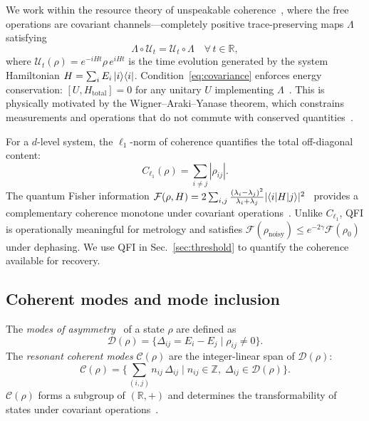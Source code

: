 \documentclass[prx,twocolumn,superscriptaddress,longbibliography,floatfix]{revtex4-2}
\begin{document}
We work within the resource theory of unspeakable coherence~\cite{Shiraishi2024,Marvian2014,Lostaglio2019}, where the free operations are covariant channels---completely positive trace-preserving maps $\Lambda$ satisfying
\begin{equation}
\Lambda \circ \mathcal{U}_t = \mathcal{U}_t \circ \Lambda \quad \forall\, t \in \mathbb{R},
\label{eq:covariance}
\end{equation}
where $\mathcal{U}_t(\rho) = e^{-iHt} \rho\, e^{iHt}$ is the time evolution generated by the system Hamiltonian $H = \sum_i E_i \ket{i}\!\bra{i}$.
Condition~\eqref{eq:covariance} enforces energy conservation: $[U, H_\mathrm{total}] = 0$ for any unitary $U$ implementing $\Lambda$~\cite{Marvian2014}.
This is physically motivated by the Wigner--Araki--Yanase theorem, which constrains measurements and operations that do not commute with conserved quantities~\cite{Wigner1952}.

For a $d$-level system, the $\ell_1$-norm of coherence quantifies the total off-diagonal content:
\begin{equation}
C_{\ell_1}(\rho) = \sum_{i \neq j} |\rho_{ij}|.
\label{eq:l1coherence}
\end{equation}
The quantum Fisher information $\mathcal{F}(\rho, H) = 2 \sum_{i,j} \frac{(\lambda_i - \lambda_j)^2}{\lambda_i + \lambda_j} |\!\braket{i|H|j}\!|^2$~\cite{Braunstein1994} provides a complementary coherence monotone under covariant operations~\cite{Shiraishi2024}.
Unlike $C_{\ell_1}$, QFI is operationally meaningful for metrology and satisfies $\mathcal{F}(\rho_\mathrm{noisy}) \leq e^{-2\gamma} \mathcal{F}(\rho_0)$ under dephasing.
We use QFI in Sec.~\ref{sec:threshold} to quantify the coherence available for recovery.


\subsection{Coherent modes and mode inclusion}
\label{sec:modes}

The \emph{modes of asymmetry}~\cite{Lostaglio2019} of a state $\rho$ are defined as
\begin{equation}
\mathcal{D}(\rho) = \bigl\{ \Delta_{ij} = E_i - E_j \mid \rho_{ij} \neq 0 \bigr\}.
\label{eq:modes}
\end{equation}
The \emph{resonant coherent modes} $\mathcal{C}(\rho)$ are the integer-linear span of $\mathcal{D}(\rho)$:
\begin{equation}
\mathcal{C}(\rho) = \biggl\{ \sum_{(i,j)} n_{ij}\, \Delta_{ij} \;\bigg|\; n_{ij} \in \mathbb{Z},\; \Delta_{ij} \in \mathcal{D}(\rho) \biggr\}.
\label{eq:resonant_modes}
\end{equation}
$\mathcal{C}(\rho)$ forms a subgroup of $(\mathbb{R}, +)$ and determines the transformability of states under covariant operations~\cite{Shiraishi2024}.
\end{document}
